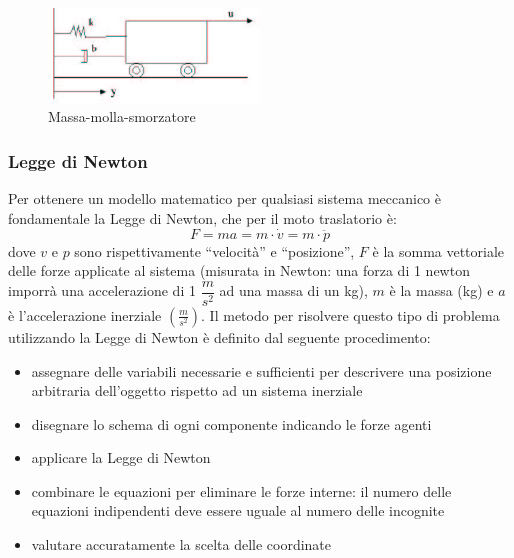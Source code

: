 \documentclass[a4paper]{report}
\begin{document}
\begin{figure}[!b]
\centering
\includegraphics[width=0.5\textwidth]{./images/massa-molla-smorzatore.png}
\caption{Massa-molla-smorzatore\label{fig:massa-molla-smorzatore}}
\end{figure}

\subsubsection{Legge di Newton}\label{leggedinewton}
Per ottenere un modello matematico per qualsiasi sistema meccanico \`e
fondamentale la Legge di Newton, che per il moto traslatorio \`e:
\begin{equation}
  F = ma = m \cdot \dot{v} = m \cdot \ddot{p}
\end{equation}
dove $v$ e $p$ sono rispettivamente ``velocit\`a'' e ``posizione'',
$F$ \`e la somma vettoriale delle forze applicate al sistema (misurata
in Newton: una forza di 1 newton imporr\`a una accelerazione di 1
$\dfrac{m}{s^2}$ ad una massa di un kg), $m$ \`e la massa
(kg) e $a$ \`e l'accelerazione inerziale $\left(\frac{m}{s^2}\right)$.
Il metodo per risolvere questo tipo di problema utilizzando la Legge
di Newton \`e definito dal seguente procedimento:

\begin{itemize}
  \item assegnare delle variabili necessarie e sufficienti per
    descrivere una posizione arbitraria dell'oggetto rispetto ad un
    sistema inerziale
  \item disegnare lo schema di ogni componente indicando le forze
    agenti
  \item applicare la Legge di Newton
  \item combinare le equazioni per eliminare le forze interne: il
    numero delle equazioni indipendenti deve essere uguale al numero
    delle incognite
  \item valutare accuratamente la scelta delle coordinate
\end{itemize}
\end{document}
